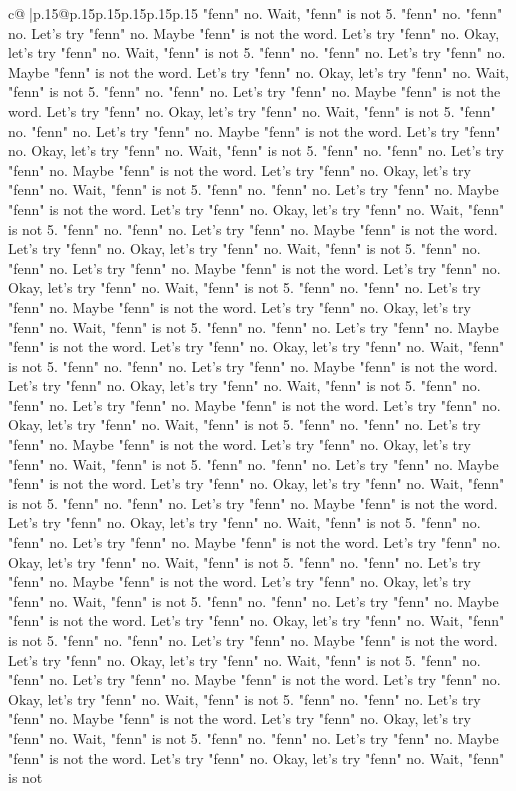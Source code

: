 \documentclass{article}
\begin{document}
{\begin{supertabular}{c@{$\;$}|p{.15\linewidth}@{}p{.15\linewidth}p{.15\linewidth}p{.15\linewidth}p{.15\linewidth}p{.15\linewidth}}
{{{"fenn" no. Wait, "fenn" is not 5. "fenn" no. "fenn" no. Let's try "fenn" no. Maybe "fenn" is not the word. Let's try "fenn" no. Okay, let's try "fenn" no. Wait, "fenn" is not 5. "fenn" no. "fenn" no. Let's try "fenn" no. Maybe "fenn" is not the word. Let's try "fenn" no. Okay, let's try "fenn" no. Wait, "fenn" is not 5. "fenn" no. "fenn" no. Let's try "fenn" no. Maybe "fenn" is not the word. Let's try "fenn" no. Okay, let's try "fenn" no. Wait, "fenn" is not 5. "fenn" no. "fenn" no. Let's try "fenn" no. Maybe "fenn" is not the word. Let's try "fenn" no. Okay, let's try "fenn" no. Wait, "fenn" is not 5. "fenn" no. "fenn" no. Let's try "fenn" no. Maybe "fenn" is not the word. Let's try "fenn" no. Okay, let's try "fenn" no. Wait, "fenn" is not 5. "fenn" no. "fenn" no. Let's try "fenn" no. Maybe "fenn" is not the word. Let's try "fenn" no. Okay, let's try "fenn" no. Wait, "fenn" is not 5. "fenn" no. "fenn" no. Let's try "fenn" no. Maybe "fenn" is not the word. Let's try "fenn" no. Okay, let's try "fenn" no. Wait, "fenn" is not 5. "fenn" no. "fenn" no. Let's try "fenn" no. Maybe "fenn" is not the word. Let's try "fenn" no. Okay, let's try "fenn" no. Wait, "fenn" is not 5. "fenn" no. "fenn" no. Let's try "fenn" no. Maybe "fenn" is not the word. Let's try "fenn" no. Okay, let's try "fenn" no. Wait, "fenn" is not 5. "fenn" no. "fenn" no. Let's try "fenn" no. Maybe "fenn" is not the word. Let's try "fenn" no. Okay, let's try "fenn" no. Wait, "fenn" is not 5. "fenn" no. "fenn" no. Let's try "fenn" no. Maybe "fenn" is not the word. Let's try "fenn" no. Okay, let's try "fenn" no. Wait, "fenn" is not 5. "fenn" no. "fenn" no. Let's try "fenn" no. Maybe "fenn" is not the word. Let's try "fenn" no. Okay, let's try "fenn" no. Wait, "fenn" is not 5. "fenn" no. "fenn" no. Let's try "fenn" no. Maybe "fenn" is not the word. Let's try "fenn" no. Okay, let's try "fenn" no. Wait, "fenn" is not 5. "fenn" no. "fenn" no. Let's try "fenn" no. Maybe "fenn" is not the word. Let's try "fenn" no. Okay, let's try "fenn" no. Wait, "fenn" is not 5. "fenn" no. "fenn" no. Let's try "fenn" no. Maybe "fenn" is not the word. Let's try "fenn" no. Okay, let's try "fenn" no. Wait, "fenn" is not 5. "fenn" no. "fenn" no. Let's try "fenn" no. Maybe "fenn" is not the word. Let's try "fenn" no. Okay, let's try "fenn" no. Wait, "fenn" is not 5. "fenn" no. "fenn" no. Let's try "fenn" no. Maybe "fenn" is not the word. Let's try "fenn" no. Okay, let's try "fenn" no. Wait, "fenn" is not 5. "fenn" no. "fenn" no. Let's try "fenn" no. Maybe "fenn" is not the word. Let's try "fenn" no. Okay, let's try "fenn" no. Wait, "fenn" is not 5. "fenn" no. "fenn" no. Let's try "fenn" no. Maybe "fenn" is not the word. Let's try "fenn" no. Okay, let's try "fenn" no. Wait, "fenn" is not 5. "fenn" no. "fenn" no. Let's try "fenn" no. Maybe "fenn" is not the word. Let's try "fenn" no. Okay, let's try "fenn" no. Wait, "fenn" is not 5. "fenn" no. "fenn" no. Let's try "fenn" no. Maybe "fenn" is not the word. Let's try "fenn" no. Okay, let's try "fenn" no. Wait, "fenn" is not 5. "fenn" no. "fenn" no. Let's try "fenn" no. Maybe "fenn" is not the word. Let's try "fenn" no. Okay, let's try "fenn" no. Wait, "fenn" is not }}}
\end{supertabular}}
\end{document}
